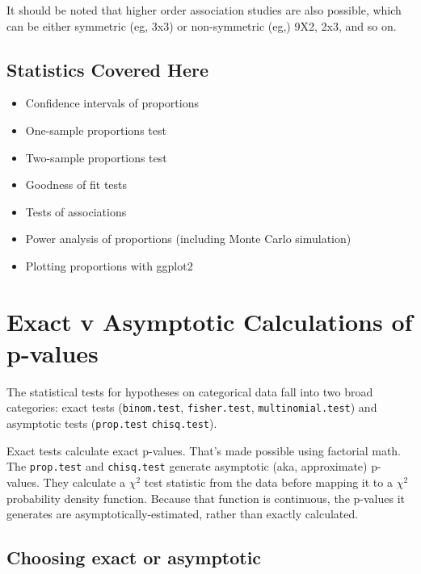 \documentclass[]{book}
\providecommand{\tightlist}{%
  \setlength{\itemsep}{0pt}\setlength{\parskip}{0pt}}
\begin{document}
It should be noted that higher order association studies are also possible, which can be either symmetric (eg, 3x3) or non-symmetric (eg,) 9X2, 2x3, and so on.

\hypertarget{statistics-covered-here}{%
\subsection{Statistics Covered Here}\label{statistics-covered-here}}

\begin{itemize}
\tightlist
\item
  Confidence intervals of proportions
\item
  One-sample proportions test
\item
  Two-sample proportions test
\item
  Goodness of fit tests
\item
  Tests of associations
\item
  Power analysis of proportions (including Monte Carlo simulation)
\item
  Plotting proportions with ggplot2
\end{itemize}

\hypertarget{exact-v-asymptotic-calculations-of-p-values}{%
\section{Exact v Asymptotic Calculations of p-values}\label{exact-v-asymptotic-calculations-of-p-values}}

The statistical tests for hypotheses on categorical data fall into two broad categories: exact tests (\texttt{binom.test}, \texttt{fisher.test}, \texttt{multinomial.test}) and asymptotic tests (\texttt{prop.test} \texttt{chisq.test}).

Exact tests calculate exact p-values. That's made possible using factorial math. The \texttt{prop.test} and \texttt{chisq.test} generate asymptotic (aka, approximate) p-values. They calculate a \(\chi^2\) test statistic from the data before mapping it to a \(\chi^2\) probability density function. Because that function is continuous, the p-values it generates are asymptotically-estimated, rather than exactly calculated.

\hypertarget{choosing-exact-or-asymptotic}{%
\subsection{Choosing exact or asymptotic}\label{choosing-exact-or-asymptotic}}
\end{document}
